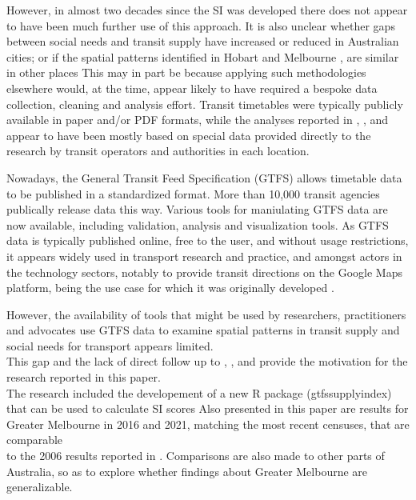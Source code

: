 \documentclass[preprint, 3p,
authoryear]{elsarticle} %
\begin{document}
However, in almost two decades since the SI was developed there does not
appear to have been much further use of this approach. It is also
unclear whether gaps between social needs and transit supply have
increased or reduced in Australian cities; or if the spatial patterns
identified in Hobart \citep{Currie2003Hobart, Currie2004Gap} and
Melbourne \citep{Currie2007Identifying, currie2010identifying}, are
similar in other places This may in part be because applying such
methodologies elsewhere would, at the time, appear likely to have
required a bespoke data collection, cleaning and analysis effort.
Transit timetables were typically publicly available in paper and/or PDF
formats, while the analyses reported in \citet{Currie2003Hobart},
\citet{Currie2004Gap}, \citet{Currie2007Identifying} and
\citet{currie2010identifying} appear to have been mostly based on
special data provided directly to the research by transit operators and
authorities in each location.

Nowadays, the General Transit Feed Specification (GTFS) allows timetable
data to be published in a standardized format. More than 10,000 transit
agencies publically release data this way. Various tools for maniulating
GTFS data are now available, including validation, analysis and
visualization tools. As GTFS data is typically published online, free to
the user, and without usage restrictions, it appears widely used in
transport research and practice, and amongst actors in the technology
sectors, notably to provide transit directions on the Google Maps
platform, being the use case for which it was originally developed
\citep{GTFS}.

However, the availability of tools that might be used by researchers,
practitioners and advocates use GTFS data to examine spatial patterns in
transit supply and social needs for transport appears limited.\\
This gap and the lack of direct follow up to \citet{Currie2003Hobart},
\citet{Currie2004Gap}, \citet{Currie2007Identifying} and
\citet{currie2010identifying} provide the motivation for the research
reported in this paper.\\
The research included the developement of a new R package
(gtfssupplyindex) that can be used to calculate SI scores Also presented
in this paper are results for Greater Melbourne in 2016 and 2021,
matching the most recent censuses, that are comparable\\
to the 2006 results reported in \citet{currie2010identifying}.
Comparisons are also made to other parts of Australia, so as to explore
whether findings about Greater Melbourne are generalizable.
\end{document}
